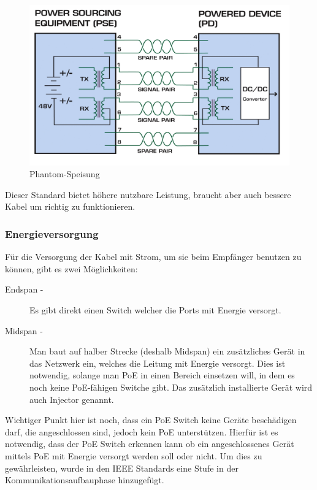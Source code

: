 \begin{figure}[h]
    \centering
    \leavevmode
    \includegraphics[width=1.0\linewidth]{figures/phantom-speisung}
    \caption{Phantom-Speisung \cite{poe1}}
    \label{fig:phantom-speisung}
\end{figure}

Dieser Standard bietet höhere nutzbare Leistung, braucht aber auch bessere Kabel um richtig zu funktionieren.

\subsubsection{Energieversorgung}

Für die Versorgung der Kabel mit Strom, um sie beim Empfänger benutzen zu können, gibt es zwei Möglichkeiten\cite{poe2}:
\begin{description}
 \item[Endspan -] Es gibt direkt einen Switch welcher die Ports mit Energie versorgt.
 \item[Midspan -]Man baut auf halber Strecke (deshalb Midspan) ein zusätzliches Gerät in das Netzwerk ein, welches die Leitung mit Energie versorgt. Dies ist notwendig, solange man PoE in einen Bereich einsetzen will, in dem es noch keine PoE-fähigen Switche gibt. Das zusätzlich installierte Gerät wird auch Injector genannt.
\end{description}

Wichtiger Punkt hier ist noch, dass ein PoE Switch keine Geräte beschädigen darf, die angeschlossen sind, jedoch kein PoE unterstützen. Hierfür ist es notwendig, dass der PoE Switch erkennen kann ob ein angeschlossenes Gerät mittels PoE mit Energie versorgt werden soll oder nicht. Um dies zu gewährleisten, wurde in den IEEE Standards eine Stufe in der Kommunikationsaufbauphase hinzugefügt.

